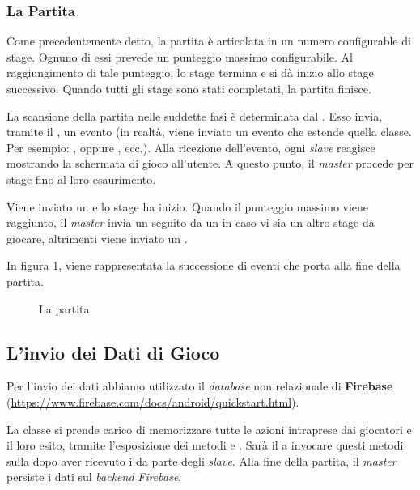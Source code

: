 \subsubsection{La Partita}
Come precedentemente detto, la partita è articolata in un numero configurable di stage. Ognuno di essi prevede un punteggio massimo configurabile. Al raggiungimento di tale punteggio, lo stage termina e si dà inizio allo stage successivo. Quando tutti gli stage sono stati completati, la partita finisce.

La scansione della partita nelle suddette fasi è determinata dal . Esso invia, tramite il , un evento  (in realtà, viene inviato un evento che estende quella classe. Per esempio: , oppure , ecc.). Alla ricezione dell'evento, ogni \textit{slave} reagisce mostrando la schermata di gioco all'utente. A questo punto, il \textit{master} procede per stage fino al loro esaurimento.

Viene inviato un  e lo stage ha inizio. Quando il punteggio massimo viene raggiunto, il \textit{master} invia un  seguito da un  in caso vi sia un altro stage da giocare, altrimenti viene inviato un .

In figura \ref{fig:game_flow}, viene rappresentata la successione di eventi che porta alla fine della partita.

\begin{figure}[h!]
\caption{La partita}
\label{fig:game_flow}

\end{figure}

\subsection{L'invio dei Dati di Gioco}
Per l'invio dei dati abbiamo utilizzato il \textit{database} non relazionale di \textbf{Firebase} (\url{https://www.firebase.com/docs/android/quickstart.html}).

La classe  si prende carico di memorizzare tutte le azioni intraprese dai giocatori e il loro esito, tramite l'esposizione dei metodi  e . Sarà il  a invocare questi metodi sulla  dopo aver ricevuto i  da parte degli \textit{slave}. Alla fine della partita, il \textit{master} persiste i dati sul \textit{backend} \textit{Firebase}.

